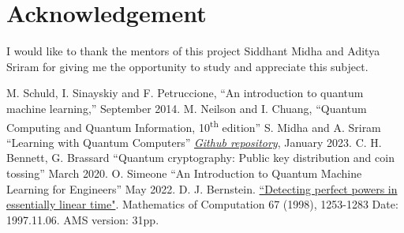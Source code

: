 \documentclass[conference]{IEEEtran}
\begin{document}
\section*{Acknowledgement}
I would like to thank the mentors of this project Siddhant Midha and Aditya Sriram for giving 
me the opportunity to study and appreciate this subject. 

\begin{thebibliography}{00}
 M. Schuld, I. Sinayskiy and F. Petruccione, ``An introduction to quantum machine learning,'' September 2014.
 M. Neilson and I. Chuang, ``Quantum Computing and Quantum Information, 10\textsuperscript{th} edition''
 S. Midha and A. Sriram ``Learning with Quantum Computers'' \href{https://github.com/siddhant-midha/WiDS-22-Learning-with-quantum-computers-}{\textit{Github repository}}, January 2023.
 C. H. Bennett, G. Brassard ``Quantum cryptography: Public key distribution and coin tossing'' March 2020.
 O. Simeone ``An Introduction to Quantum Machine Learning for Engineers'' May 2022.
 D. J. Bernstein. \href{http://cr.yp.to/papers/powers-19971106-retypeset20220326.pdf}{``Detecting perfect powers in essentially linear time"}. Mathematics of Computation 67 (1998), 1253-1283 Date: 1997.11.06. AMS version: 31pp.
\end{thebibliography}
\vspace{12pt}
\end{document}
